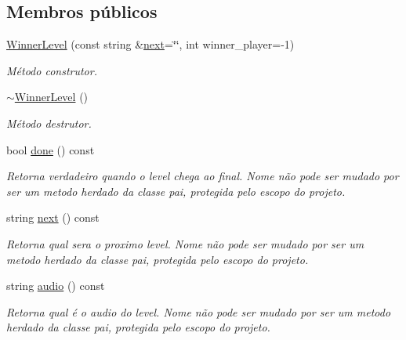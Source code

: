 \subsection*{Membros públicos}
\begin{DoxyCompactItemize}
\item 
\mbox{\hyperlink{classWinnerLevel_a63bb2594f3694e69e2735e143448b799}{Winner\+Level}} (const string \&\mbox{\hyperlink{classWinnerLevel_a927da981a2a9c97d0ff41d3a33b3457a}{next}}=\char`\"{}\char`\"{}, int winner\+\_\+player=-\/1)
\begin{DoxyCompactList}\small\item\em Método construtor. \end{DoxyCompactList}\item 
\mbox{\label{classWinnerLevel_aa410b28c353e7dcb6feb9c2d9e897957}} 
\mbox{\hyperlink{classWinnerLevel_aa410b28c353e7dcb6feb9c2d9e897957}{$\sim$\+Winner\+Level}} ()
\begin{DoxyCompactList}\small\item\em Método destrutor. \end{DoxyCompactList}\item 
bool \mbox{\hyperlink{classWinnerLevel_afc61ffd9b0457d81a2ed7400dc3490df}{done}} () const
\begin{DoxyCompactList}\small\item\em Retorna verdadeiro quando o level chega ao final. Nome não pode ser mudado por ser um metodo herdado da classe pai, protegida pelo escopo do projeto. \end{DoxyCompactList}\item 
string \mbox{\hyperlink{classWinnerLevel_a927da981a2a9c97d0ff41d3a33b3457a}{next}} () const
\begin{DoxyCompactList}\small\item\em Retorna qual sera o proximo level. Nome não pode ser mudado por ser um metodo herdado da classe pai, protegida pelo escopo do projeto. \end{DoxyCompactList}\item 
string \mbox{\hyperlink{classWinnerLevel_a855561f4edd534aa309d2b2a5d6ee3bd}{audio}} () const
\begin{DoxyCompactList}\small\item\em Retorna qual é o audio do level. Nome não pode ser mudado por ser um metodo herdado da classe pai, protegida pelo escopo do projeto. \end{DoxyCompactList}\end{DoxyCompactItemize}
